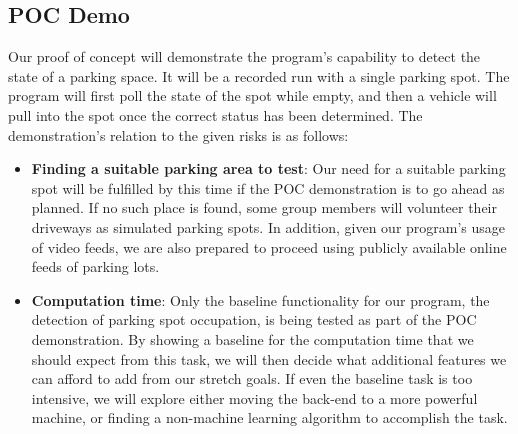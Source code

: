 \documentclass[12pt,letterpaper]{article}
\begin{document}
\subsection{POC Demo}
Our proof of concept will demonstrate the program's capability to detect the
state of a parking space. It will be a recorded run with a single parking spot.
The program will first poll the state of the spot while empty, and then a
vehicle will pull into the spot once the correct status has been determined. The
demonstration's relation to the given risks is as follows:
\begin{itemize}
    \item \textbf{Finding a suitable parking area to test}: Our need for a
    suitable parking spot will be fulfilled by this time if the POC
    demonstration is to go ahead as planned. If no such place is found, some
    group members will volunteer their driveways as simulated parking spots. In
    addition, given our program's usage of video feeds, we are also prepared to
    proceed using publicly available online feeds of parking lots.
    \item \textbf{Computation time}: Only the baseline functionality for our
    program, the detection of parking spot occupation, is being tested as part
    of the POC demonstration. By showing a baseline for the computation time
    that we should expect from this task, we will then decide what additional
    features we can afford to add from our stretch goals. If even the baseline
    task is too intensive, we will explore either moving the back-end to a more
    powerful machine, or finding a non-machine learning algorithm to accomplish
    the task.
\end{itemize}


\end{document}
